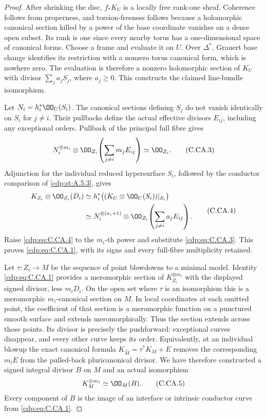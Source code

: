 \begin{proof}
After shrinking the disc, $f_*K_U$ is a locally free
rank-one sheaf. Coherence follows from properness, and
torsion-freeness follows because a holomorphic canonical
section killed by a power of the base coordinate vanishes
on a dense open subset. Its rank is one since every nearby
torus has a one-dimensional space of canonical forms.
Choose a frame and evaluate it on $U$. Over $\Delta^*$,
Grauert base change identifies its restriction with a
nonzero torus canonical form, which is nowhere zero.
The evaluation is therefore a nonzero holomorphic section
of $K_U$ with divisor $\sum_j a_jS_j$, where $a_j\ge0$.
This constructs the claimed line-bundle isomorphism.

Let $N_i=h_i^*\OO_U(S_i)$. The canonical sections defining
$S_j$ do not vanish identically on $S_i$ for $j\ne i$.
Their pullbacks define the actual effective divisors
$E_{ij}$, including any exceptional orders. Pullback of
the principal full fibre gives
\[
 N_i^{\otimes m_i}\otimes
 \OO_{Z_i}\!\left(\sum_{j\ne i}m_jE_{ij}\right)
                         \simeq\OO_{Z_i}.               \tag{C.CA.3}\label{cdp:eq:C.CA.3}
\]
Adjunction for the individual reduced hypersurface $S_i$,
followed by the conductor comparison of \ref{cdp:st:A.5.3}, gives
\[
 \begin{split}
 K_{Z_i}\otimes\OO_{Z_i}(D_i)
   &\simeq h_i^*\bigl((K_U\otimes\OO_U(S_i))|_{S_i}\bigr)\\
   &\simeq N_i^{\otimes(a_i+1)}\otimes
      \OO_{Z_i}\!\left(\sum_{j\ne i}a_jE_{ij}\right).
 \end{split}                                             \tag{C.CA.4}\label{cdp:eq:C.CA.4}
\]
Raise \eqref{cdp:eq:C.CA.4} to the $m_i$-th power and substitute
\eqref{cdp:eq:C.CA.3}. This proves \eqref{cdp:eq:C.CA.1}, with its signs and every
full-fibre multiplicity retained.

Let $\tau:Z_i\to M$ be the sequence of point blowdowns
to a minimal model. Identity \eqref{cdp:eq:C.CA.1} provides a
meromorphic section of $K_{Z_i}^{\otimes m_i}$ with the
displayed signed divisor, less $m_iD_i$. On the open set
where $\tau$ is an isomorphism this is a meromorphic
$m_i$-canonical section on $M$. In local coordinates at
each omitted point, the coefficient of that section is a
meromorphic function on a punctured smooth surface and
extends meromorphically. Thus the section extends across
those points. Its divisor is precisely the pushforward:
exceptional curves disappear, and every other curve
keeps its order. Equivalently, at an individual blowup
the exact canonical formula
$K_{\widehat M}=\tau^*K_M+E$ removes the corresponding
$m_iE$ from the pulled-back pluricanonical divisor.
We have therefore constructed a signed integral divisor
$B$ on $M$ and an actual isomorphism
\[
                         K_M^{\otimes m_i}\simeq\OO_M(B).
                                                               \tag{C.CA.5}\label{cdp:eq:C.CA.5}
\]
Every component of $B$ is the image of an interface or
intrinsic conductor curve from \eqref{cdp:eq:C.CA.1}.


\end{proof}
